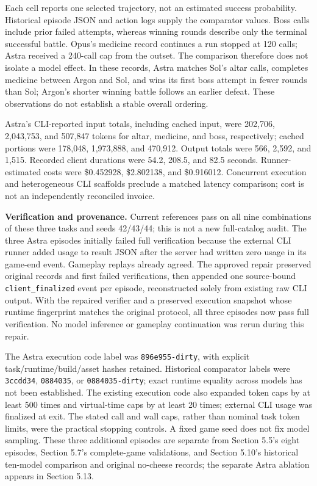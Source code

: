 \documentclass[11pt,a4paper]{article}
\begin{document}
Each cell reports one selected trajectory, not an estimated success probability. Historical episode JSON and action logs supply the comparator values. Boss calls include prior failed attempts, whereas winning rounds describe only the terminal successful battle. Opus's medicine record continues a run stopped at 120 calls; Astra received a 240-call cap from the outset. The comparison therefore does not isolate a model effect. In these records, Astra matches Sol's altar calls, completes medicine between Argon and Sol, and wins its first boss attempt in fewer rounds than Sol; Argon's shorter winning battle follows an earlier defeat. These observations do not establish a stable overall ordering.

Astra's CLI-reported input totals, including cached input, were 202,706, 2,043,753, and 507,847 tokens for altar, medicine, and boss, respectively; cached portions were 178,048, 1,973,888, and 470,912. Output totals were 566, 2,592, and 1,515. Recorded client durations were 54.2, 208.5, and 82.5 seconds. Runner-estimated costs were \$0.452928, \$2.802138, and \$0.916012. Concurrent execution and heterogeneous CLI scaffolds preclude a matched latency comparison; cost is not an independently reconciled invoice.

\textbf{Verification and provenance.} Current references pass on all nine combinations of these three tasks and seeds 42/43/44; this is not a new full-catalog audit. The three Astra episodes initially failed full verification because the external CLI runner added usage to result JSON after the server had written zero usage in its game-end event. Gameplay replays already agreed. The approved repair preserved original records and first failed verifications, then appended one source-bound \texttt{client\allowbreak{}\_\allowbreak{}finalized} event per episode, reconstructed solely from existing raw CLI output. With the repaired verifier and a preserved execution snapshot whose runtime fingerprint matches the original protocol, all three episodes now pass full verification. No model inference or gameplay continuation was rerun during this repair.

The Astra execution code label was \texttt{896e955\allowbreak{}-\allowbreak{}dirty}, with explicit task/runtime/build/asset hashes retained. Historical comparator labels were \texttt{3ccdd34}, \texttt{0884035}, or \texttt{0884035\allowbreak{}-\allowbreak{}dirty}; exact runtime equality across models has not been established. The existing execution code also expanded token caps by at least 500 times and virtual-time caps by at least 20 times; external CLI usage was finalized at exit. The stated call and wall caps, rather than nominal task token limits, were the practical stopping controls. A fixed game seed does not fix model sampling. These three additional episodes are separate from Section 5.5's eight episodes, Section 5.7's complete-game validations, and Section 5.10's historical ten-model comparison and original no-cheese records; the separate Astra ablation appears in Section 5.13.
\end{document}
